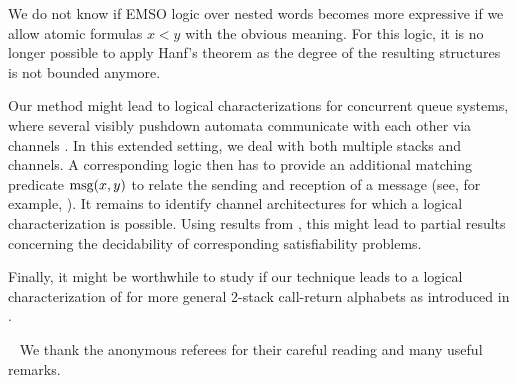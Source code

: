 \documentclass{LMCS}
\begin{document}
We do not know if EMSO logic over nested words becomes more expressive if we
allow atomic formulas $x \mathrel{<} y$ with the obvious meaning. For this
logic, it is no longer possible to apply Hanf's theorem as the degree of the
resulting structures is not bounded anymore.

Our method might lead to logical characterizations for concurrent queue
systems, where several visibly pushdown automata communicate with each other
via channels \cite{TACAS08}. In this extended setting, we deal with both
multiple stacks and channels. A corresponding logic then has to provide an
additional matching predicate $\textup{msg}(x,y)$ to relate the sending and
reception of a message (see, for example, \cite{BolligJournal}). It remains to
identify channel architectures for which a logical characterization is
possible. Using results from \cite{TACAS08}, this might lead to partial
results concerning the decidability of corresponding satisfiability problems.

Finally, it might be worthwhile to study if our technique leads to a logical
characterization of \tVPA for more general 2-stack call-return alphabets as
introduced in \cite{Murano2007}.

~ We thank the anonymous referees for their
careful reading and many useful remarks.
\end{document}
